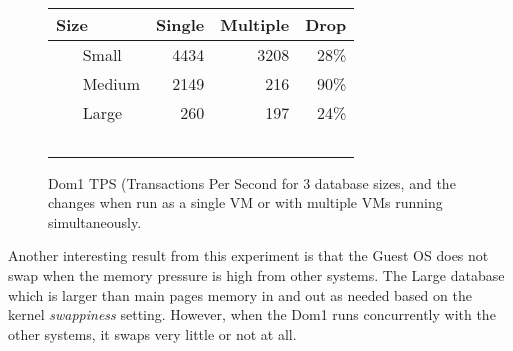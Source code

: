 \begin{figure}
  \begin{tabular}{ l | r | r | r }
    Size & Single & Multiple & Drop \\
    \hline
    Small & 4434 & 3208 & 28\% \\ \hline
    Medium & 2149 & 216 & 90\% \\ \hline
    Large & 260 & 197 & 24\% \\  \hline
  \end{tabular}
\caption{Dom1 TPS (Transactions Per Second for 3 database sizes, and the changes when run as a single VM or with multiple VMs running simultaneously.}
\label{fig:tps1}
\end{figure}

Another interesting result from this experiment is that the Guest OS does not swap when the memory pressure is high from other systems.  The Large database which is larger than main pages memory in and out as needed based on the kernel \emph{swappiness} setting.  However, when the Dom1 runs concurrently with the other systems, it swaps very little or not at all.
